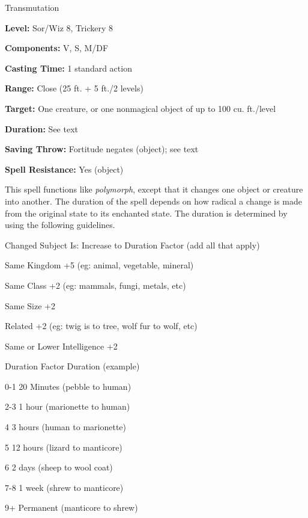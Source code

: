 
Transmutation

\textbf{Level:} Sor/Wiz 8, Trickery 8

\textbf{Components:} V, S, M/DF

\textbf{Casting Time:} 1 standard action

\textbf{Range:} Close (25 ft. + 5 ft./2 levels)

\textbf{Target:} One creature, or one nonmagical object of up to 100 cu. ft./level

\textbf{Duration:} See text

\textbf{Saving Throw:} Fortitude negates (object); see text

\textbf{Spell Resistance:} Yes (object)

This spell functions like \textit{polymorph}, except that it changes one object 
or creature into another. The duration of the spell depends on how radical a change 
is made from the original state to its enchanted state. The duration is determined 
by using the following guidelines.

\begin{description*}
\item[Changed Subject Is:] Increase to Duration Factor (add all that apply)
\item[Same Kingdom] +5 (eg: animal, vegetable, mineral)
\item[Same Class] +2 (eg: mammals, fungi, metals, etc)
\item[Same Size] +2
\item[Related] +2 (eg: twig is to tree, wolf fur to wolf, etc)
\item[Same or Lower Intelligence] +2
\end{description*}

\begin{description*}
\item[Duration Factor] Duration (example)
\item[0-1] 20 Minutes (pebble to human)
\item[2-3] 1 hour (marionette to human)
\item[4] 3 hours (human to marionette)
\item[5] 12 hours (lizard to manticore)
\item[6] 2 days (sheep to wool coat)
\item[7-8] 1 week (shrew to manticore)
\item[9+] Permanent (manticore to shrew)
\end{description*}


